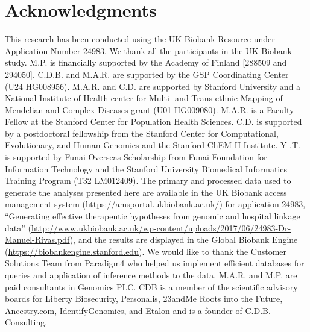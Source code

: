 \section*{Acknowledgments}
This research has been conducted using the UK Biobank Resource under Application Number 24983. We thank all the participants in the UK Biobank study. M.P. is financially supported by the Academy of Finland [288509 and 294050]. C.D.B. and M.A.R. are supported by the GSP Coordinating Center (U24 HG008956). M.A.R. and C.D. are supported by Stanford University and a National Institute of Health center for Multi- and Trans-ethnic Mapping of Mendelian and Complex Diseases grant (U01 HG009080). M.A.R. is a Faculty Fellow at the Stanford Center for Population Health Sciences. C.D. is supported by a postdoctoral fellowship from the Stanford Center for Computational, Evolutionary, and Human Genomics and the Stanford ChEM-H Institute. Y .T. is supported by Funai Overseas Scholarship from Funai Foundation for Information Technology and the Stanford University Biomedical Informatics Training Program (T32 LM012409). The primary and processed data used to generate the analyses presented here are available in the UK Biobank access management system (\url{https://amsportal.ukbiobank.ac.uk/}) for application 24983, ``Generating effective therapeutic hypotheses from genomic and hospital linkage data'' (\url{http://www.ukbiobank.ac.uk/wp-content/uploads/2017/06/24983-Dr-Manuel-Rivas.pdf}), and the results are displayed in the Global Biobank Engine (\url{https://biobankengine.stanford.edu}). We would like to thank the Customer Solutions Team from Paradigm4 who helped us implement efficient databases for queries and application of inference methods to the data. M.A.R. and M.P. are paid consultants in Genomics PLC. CDB is a member of the scientific advisory boards for Liberty Biosecurity, Personalis, 23andMe Roots into the Future, Ancestry.com, IdentifyGenomics, and Etalon and is a founder of C.D.B. Consulting. 

\nolinenumbers

% 

